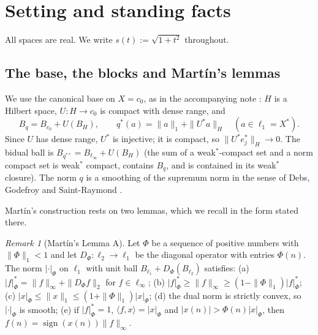 \documentclass[10pt]{amsart}
\theoremstyle{definition}
\theoremstyle{remark}
\newtheorem{remark}[theorem]{Remark}
\newcommand{\sgn}{\operatorname{sign}}
\newcommand{\ip}[2]{\langle #1,#2\rangle}
\begin{document}
\section{Setting and standing facts}\label{sec:setting}

All spaces are real.  We write $s(t):=\sqrt{1+t^2}$ throughout.

\subsection{The base, the blocks and Mart\'in's lemmas}
We use the canonical base on $X=c_0$, as in the accompanying note
\cite{PrA}: $H$ is a Hilbert space, $U:H\to c_0$ is compact with dense
range, and
\[
 B_q=B_{c_0}+U(B_H),\qquad q^*(a)=\|a\|_1+\|U^*a\|_H\quad(a\in\ell_1=X^*).
\]
Since $U$ has dense range, $U^*$ is injective; it is compact, so
$\|U^*e_j^*\|_H\to0$.  The bidual ball is $B_{q^{**}}=B_{\ell_\infty}+U(B_H)$
(the sum of a weak$^*$-compact set and a norm compact set is weak$^*$
compact, contains $B_q$, and is contained in its weak$^*$ closure).  The
norm $q$ is a smoothing of the supremum norm in the sense of
Debs, Godefroy and Saint-Raymond \cite{DGS}.

Mart\'in's construction \cite{Martin} rests on two lemmas, which we recall
in the form stated there.

\begin{remark}[Mart\'in's Lemma A]\label{rem:lemmaA}
Let $\Phi$ be a sequence of positive numbers with $\|\Phi\|_1<1$ and let
$D_\Phi:\ell_2\to\ell_1$ be the diagonal operator with entries $\Phi(n)$.
The norm $|\cdot|_\Phi$ on $\ell_1$ with unit ball
$B_{\ell_1}+D_\Phi(B_{\ell_2})$ satisfies:
(a) $|f|_\Phi^*=\|f\|_\infty+\|D_\Phi f\|_2$ for $f\in\ell_\infty$;
(b) $|f|^*_\Phi\geq\|f\|_\infty\geq(1-\|\Phi\|_1)|f|^*_\Phi$;
(c) $|x|_\Phi\leq\|x\|_1\leq(1+\|\Phi\|_1)|x|_\Phi$;
(d) the dual norm is strictly convex, so $|\cdot|_\Phi$ is smooth;
(e) if $|f|^*_\Phi=1$, $\ip{f}{x}=|x|_\Phi$ and $|x(n)|>\Phi(n)|x|_\Phi$,
then $f(n)=\sgn(x(n))\|f\|_\infty$.
\end{remark}
\end{document}
